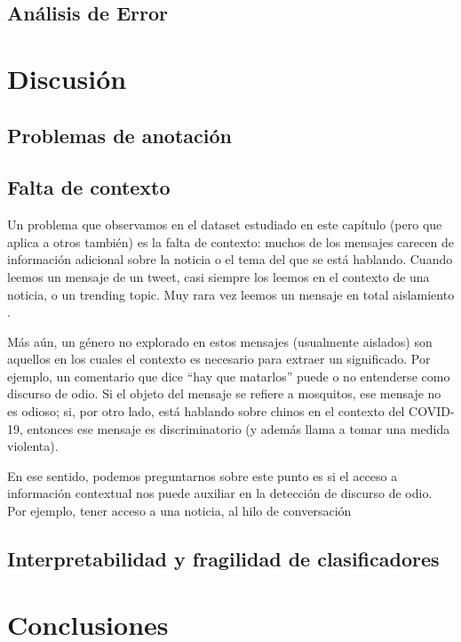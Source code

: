\subsection{Análisis de Error}


\section{Discusión}

\subsection{Problemas de anotación}

\subsection{Falta de contexto}

Un problema que observamos en el dataset estudiado en este capítulo (pero que aplica a otros también) es la falta de contexto: muchos de los mensajes carecen de información adicional sobre la noticia o el tema del que se está hablando. Cuando leemos un mensaje de un tweet, casi siempre los leemos en el contexto de una noticia, o un trending topic. Muy rara vez leemos un mensaje en total aislamiento .

Más aún, un género no explorado en estos mensajes (usualmente aislados) son aquellos en los cuales el contexto es necesario para extraer un significado. Por ejemplo, un comentario que dice ``hay que matarlos'' puede o no entenderse como discurso de odio. Si el objeto del mensaje se refiere a mosquitos, ese mensaje no es odioso; si, por otro lado, está hablando sobre chinos en el contexto del COVID-19, entonces ese mensaje es discriminatorio (y además llama a tomar una medida violenta).

En ese sentido, podemos preguntarnos sobre este punto es si el acceso a información contextual nos puede auxiliar en la detección de discurso de odio. Por ejemplo, tener acceso a una noticia, al hilo de conversación


\subsection{Interpretabilidad y fragilidad de clasificadores}

\section{Conclusiones}

